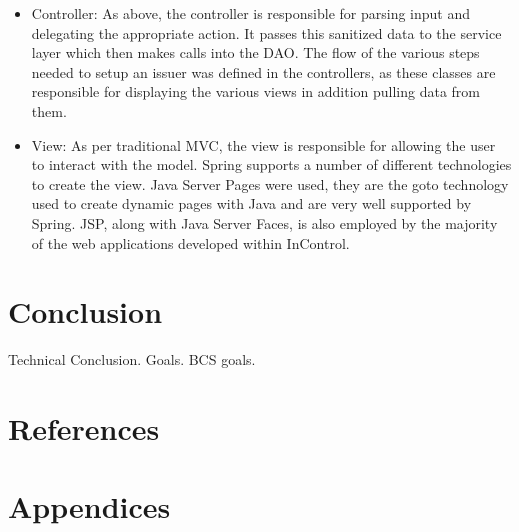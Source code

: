 \documentclass[a4paper, 11pt, titlepage]{article}
\begin{document}
\begin{itemize}
\item Controller: As above, the controller is responsible for parsing input and delegating the appropriate action. It passes this sanitized data to the service layer which then makes calls into the DAO. The flow of the various steps needed to setup an issuer was defined in the controllers, as these classes are responsible for displaying the various views in addition pulling data from them.
\item View: As per traditional MVC, the view is responsible for allowing the user to interact with the model. Spring supports a number of different technologies to create the view. Java Server Pages were used, they are the goto technology used to create dynamic pages with Java and are very well supported by Spring. JSP, along with Java Server Faces, is also employed by the majority of the web applications developed within InControl.
\end{itemize}

\section{Conclusion}
Technical Conclusion. Goals. BCS goals.
\section{References}

\section{Appendices}
\end{document}
